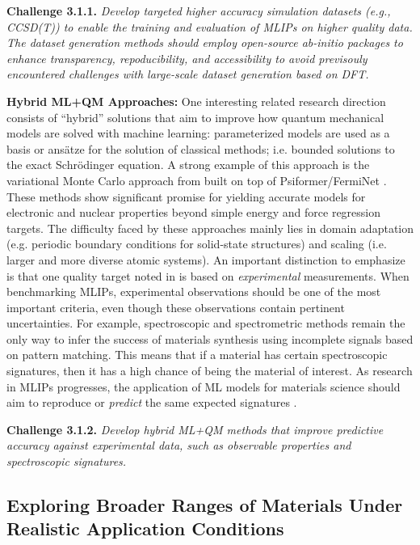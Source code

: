 \textbf{Challenge 3.1.1.} \textit{Develop targeted higher accuracy simulation datasets (e.g., CCSD(T)) to enable the training and evaluation of MLIPs on higher quality data. The dataset generation methods should employ open-source ab-initio packages to enhance transparency, repoducibility, and accessibility to avoid previsouly encountered challenges with large-scale dataset generation based on DFT.}


\textbf{Hybrid ML+QM Approaches:} One interesting related research direction consists of ``hybrid'' solutions that aim to improve how quantum mechanical models are solved with machine learning: parameterized models are used as a basis or ans\"{a}tze for the solution of classical methods; i.e. bounded solutions to the exact Schr\"{o}dinger equation. A strong example of this approach is the variational Monte Carlo approach from \citet{pfauAccurateComputationQuantum2024} built on top of Psiformer/FermiNet \citep{pfau2020ferminet,glehnSelfAttentionAnsatzAbinitio2023}. These methods show significant promise for yielding accurate models for electronic and nuclear properties beyond simple energy and force regression targets. The difficulty faced by these approaches mainly lies in domain adaptation (e.g. periodic boundary conditions for solid-state structures) and scaling (i.e. larger and more diverse atomic systems). An important distinction to emphasize is that one quality target noted in \citet{pfauAccurateComputationQuantum2024} is based on \emph{experimental} measurements. 
When benchmarking MLIPs, experimental observations should be one of the most important criteria, even though these observations contain pertinent uncertainties. For example, spectroscopic and spectrometric methods remain the only way to infer the success of materials synthesis using incomplete signals based on pattern matching. This means that if a material has certain spectroscopic signatures, then it has a high chance of being the material of interest. 
As research in MLIPs progresses, the application of ML models for materials science should aim to reproduce or \emph{predict} the same expected signatures \citep{cheng2024determining}.

\textbf{Challenge 3.1.2.} \textit{Develop hybrid ML+QM methods that improve predictive accuracy against experimental data, such as observable properties and spectroscopic signatures.}


\subsection{Exploring Broader Ranges of Materials Under Realistic Application Conditions} \label{sec:mat-limits}

